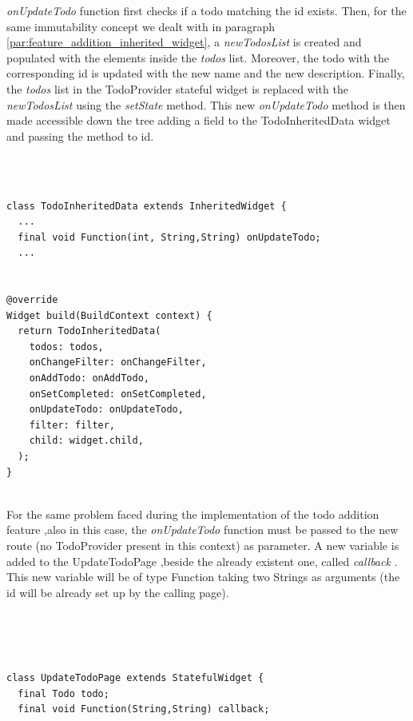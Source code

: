 \textit{onUpdateTodo} function first checks if a todo matching the id exists. Then, for the same immutability concept we dealt with in paragraph \ref{par:feature_addition_inherited_widget}, a \textit{newTodosList }is created and populated with the elements inside the \textit{todos }list. Moreover, the todo with the corresponding id is updated with the new name and the new description. Finally, the \textit{todos }list in the TodoProvider stateful widget is replaced with the \textit{newTodosList }using the \textit{setState} method.
This new \textit{onUpdateTodo} method is then made accessible down the tree adding a field to the TodoInheritedData widget and passing the method to id.
\mbox{}\\
\begin{code}

\mbox{}\\

\label{code:2.38}
\begin{verbatim}

class TodoInheritedData extends InheritedWidget {
  ...
  final void Function(int, String,String) onUpdateTodo;
  ...


@override
Widget build(BuildContext context) {
  return TodoInheritedData(
    todos: todos,
    onChangeFilter: onChangeFilter,
    onAddTodo: onAddTodo,
    onSetCompleted: onSetCompleted,
    onUpdateTodo: onUpdateTodo,
    filter: filter,
    child: widget.child,
  );
}
\end{verbatim}
\end{code}
\mbox{}\\
For the same problem faced during the implementation of the todo addition feature ,also in this case, the \textit{onUpdateTodo } function must be passed to the new route (no TodoProvider present in this context) as parameter. A new variable is added to the UpdateTodoPage ,beside the already existent one, called \textit{callback }. This new variable will be of type Function taking two Strings as arguments (the id will be already set up by the calling page).
\begin{code}
\mbox{}\\

\mbox{}\\
\label{code:2.39}
\begin{verbatim}

class UpdateTodoPage extends StatefulWidget {
  final Todo todo;
  final void Function(String,String) callback;
 \end{verbatim}
 \end{code}
 \mbox{}\\

